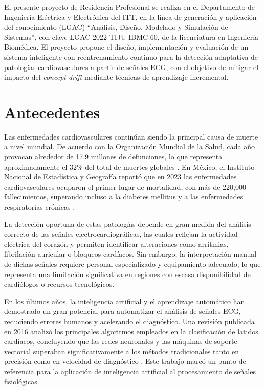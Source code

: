 El presente proyecto de Residencia Profesional se realiza en el Departamento de Ingeniería Eléctrica y Electrónica del ITT, en la línea de generación y aplicación del conocimiento (LGAC) ``Análisis, Diseño, Modelado y Simulación de Sistemas'', con clave LGAC-2022-TIJU-IBMC-60, de la licenciatura en Ingeniería Biomédica. El proyecto propone el diseño, implementación y evaluación de un sistema inteligente con reentrenamiento continuo para la detección adaptativa de patologías cardiovasculares a partir de señales ECG, con el objetivo de mitigar el impacto del \textit{concept drift} mediante técnicas de aprendizaje incremental.

\section{Antecedentes}

Las enfermedades cardiovasculares continúan siendo la principal causa de muerte a nivel mundial. De acuerdo con la Organización Mundial de la Salud, cada año provocan alrededor de 17.9 millones de defunciones, lo que representa aproximadamente el 32\% del total de muertes globales \cite{WHO2024}. En México, el Instituto Nacional de Estadística y Geografía reportó que en 2023 las enfermedades cardiovasculares ocuparon el primer lugar de mortalidad, con más de 220,000 fallecimientos, superando incluso a la diabetes mellitus y a las enfermedades respiratorias crónicas \cite{INEGI2024}.

La detección oportuna de estas patologías depende en gran medida del análisis correcto de las señales electrocardiográficas, las cuales reflejan la actividad eléctrica del corazón y permiten identificar alteraciones como arritmias, fibrilación auricular o bloqueos cardíacos. Sin embargo, la interpretación manual de dichas señales requiere personal especializado y equipamiento adecuado, lo que representa una limitación significativa en regiones con escasa disponibilidad de cardiólogos o recursos tecnológicos.

En los últimos años, la inteligencia artificial y el aprendizaje automático han demostrado un gran potencial para automatizar el análisis de señales ECG, reduciendo errores humanos y acelerando el diagnóstico. Una revisión publicada en 2016 analizó los principales algoritmos empleados en la clasificación de latidos cardíacos, concluyendo que las redes neuronales y las máquinas de soporte vectorial superaban significativamente a los métodos tradicionales tanto en precisión como en velocidad de diagnóstico \cite{Luz2016}. Este trabajo marcó un punto de referencia para la aplicación de inteligencia artificial al procesamiento de señales fisiológicas.

